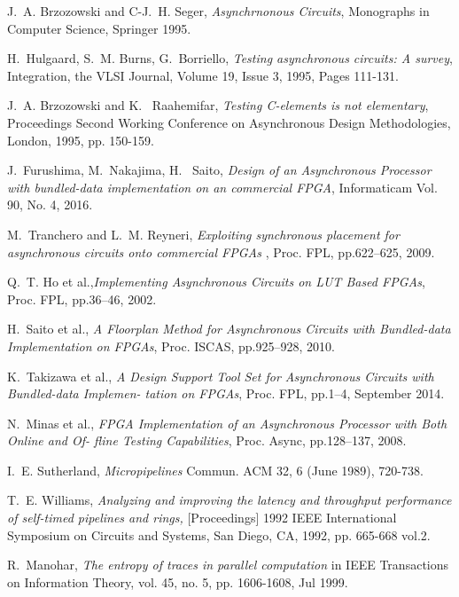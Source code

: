 \documentclass[10pt,journal,compsoc]{IEEEtran}
\begin{document}
\begin{thebibliography}{1}



	J.~A. Brzozowski and C-J.~H. Seger, \emph{Asynchrnonous Circuits},
		Monographs in Computer Science, Springer 1995.

	H.~Hulgaard, S.~M. Burns, G.~Borriello, \emph{Testing asynchronous
		circuits: A survey}, Integration, the VLSI Journal, Volume 19, Issue 3,
		1995, Pages 111-131.

	J.~A. Brzozowski and K.~ Raahemifar, \emph{Testing C-elements is not
		elementary}, Proceedings Second Working Conference on Asynchronous
		Design Methodologies, London, 1995, pp. 150-159.

	J.~Furushima, M.~Nakajima, H.~ Saito, \emph{Design of an Asynchronous
		Processor with bundled-data implementation on an commercial FPGA},
		Informaticam Vol. 90, No. 4, 2016.

	M.~Tranchero and L.~M. Reyneri, \emph{Exploiting synchronous 
		placement for asynchronous circuits onto commercial FPGAs}
		, Proc. FPL, pp.622–625, 2009.
		
		Q.~T. Ho et al.,\emph{Implementing Asynchronous Circuits
		on LUT Based FPGAs}, Proc. FPL, pp.36–46, 2002.

		H.~Saito et al., \emph{A Floorplan Method for Asynchronous Circuits
		with Bundled-data Implementation on FPGAs}, Proc. ISCAS, pp.925–928, 2010.

	K.~Takizawa et al., \emph{A Design Support Tool Set for
		Asynchronous Circuits with Bundled-data Implemen-
		tation on FPGAs}, Proc. FPL, pp.1–4, September
		2014.

	N.~Minas et al., \emph{FPGA Implementation of an
		Asynchronous Processor with Both Online and Of-
		fline Testing Capabilities}, Proc. Async, pp.128–137,
		2008.

		I.~E. Sutherland, \emph{Micropipelines} Commun. ACM 32, 6 (June 1989),
		720-738.

		T.~E. Williams, \emph{Analyzing and improving the latency and throughput
		performance of self-timed pipelines and rings,} [Proceedings] 1992 IEEE
		International Symposium on Circuits and Systems, San Diego, CA, 1992,
		pp. 665-668 vol.2.

	R.~Manohar, \emph{The entropy of traces in parallel computation} in IEEE
		Transactions on Information Theory, vol. 45, no. 5, pp. 1606-1608, Jul
		1999.


\end{thebibliography}
\end{document}
